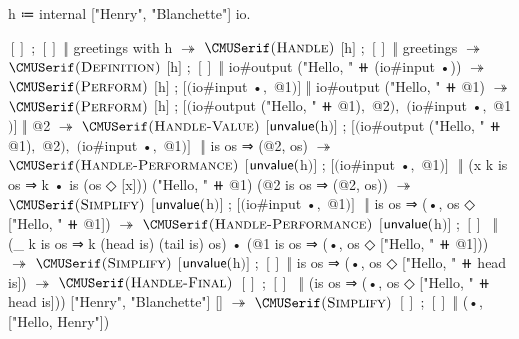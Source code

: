\begin{snippet}[caption={Handle greetings with internal \IO}]
h ≔ internal ["Henry", "Blanchette"] io.

$[]$ ; $[]$ ‖ greetings with h
$↠$ $\ruleapp{Handle}$
$[$h$]$ ; $[]$ ‖ greetings
$↠$ $\ruleapp{Definition}$
$[$h$]$ ; $[]$ ‖ io#output ("Hello, " ⧺ (io#input •))
$↠$ $\ruleapp{Perform}$
$[$h$]$ ; $[$$($io#input •$,$ @1$)$$]$ ‖ io#output ("Hello, " ⧺ @1)
$↠$ $\ruleapp{Perform}$
$[$h$]$ ; $[$$($io#output ("Hello, " ⧺ @1)$,$ @2$)$$,$ $($io#input •$,$ @1$)$$]$ ‖ @2
$↠$ $\ruleapp{Handle-Value}$
$[$$\mathsf{unvalue}($h$)$$]$ ; $[$$($io#output ("Hello, " ⧺ @1)$,$ @2$)$$,$ $($io#input •$,$ @1$)$$]$ $ $
  $ $‖ is os ⇒ (@2, os)
$↠$ $\ruleapp{Handle-Performance}$
$[$$\mathsf{unvalue}($h$)$$]$ ; $[$$($io#input •$,$ @1$)$$]$ $ $
  $ $‖ (x k is os ⇒ k • is (os ◇ [x]))
      ("Hello, " ⧺ @1) (@2 is os ⇒ (@2, os))
$↠$ $\ruleapp{Simplify}$
$[$$\mathsf{unvalue}($h$)$$]$ ; $[$$($io#input •$,$ @1$)$$]$ $ $
  $ $‖ is os ⇒ (•, os ◇ ["Hello, " ⧺ @1])
$↠$ $\ruleapp{Handle-Performance}$
$[$$\mathsf{unvalue}($h$)$$]$ ; $[]$ $ $
  $ $‖ (_ k is os ⇒ k (head is) (tail is) os)
      • (@1 is os ⇒ (•, os ◇ ["Hello, " ⧺ @1]))
$↠$ $\ruleapp{Simplify}$
$[$$\mathsf{unvalue}($h$)$$]$ ; $[]$ ‖ is os ⇒ (•, os ◇ ["Hello, " ⧺ head is])
$↠$ $\ruleapp{Handle-Final}$
$[]$ ; $[]$ $ $
  $ $‖ (is os ⇒ (•, os ◇ ["Hello, " ⧺ head is]))
      ["Henry", "Blanchette"] []
$↠$ $\ruleapp{Simplify}$
$[]$ ; $[]$ ‖ (•, ["Hello, Henry"])
\end{snippet}

%
%
%
%
%
%
%
%
%
%
%
